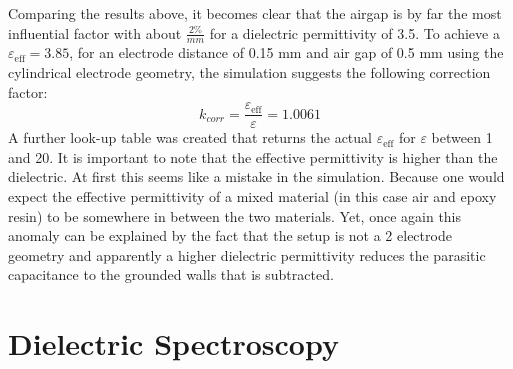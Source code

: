 Comparing the results above, it becomes clear that the airgap is by
far the most influential factor with about $\frac{2\%}{mm}$ for a dielectric permittivity of 3.5.
To achieve a $\varepsilon_{\textrm{eff}}=3.85$, for an electrode distance of 0.15 mm and air gap of 0.5 mm using the
cylindrical electrode geometry, the simulation
suggests the following correction factor:
\begin{equation}
 k_{corr}=\frac{\varepsilon_{\textrm{eff}}}{\varepsilon}=1.0061
\end{equation}
A further look-up table was created that returns the actual $\varepsilon_{\textrm{eff}}$ for $\varepsilon$ between 1 and 20.
It is important to note that the effective permittivity is higher than the dielectric. At first this seems
like a mistake in the simulation. Because one would expect the effective permittivity of a 
mixed material (in this case air and epoxy resin) to be somewhere in between the two materials.
Yet, once again this anomaly can be explained by
the fact that the setup is not a 2 electrode geometry and apparently a higher dielectric permittivity
reduces the parasitic capacitance to the grounded walls that is subtracted.



\section{Dielectric Spectroscopy}
